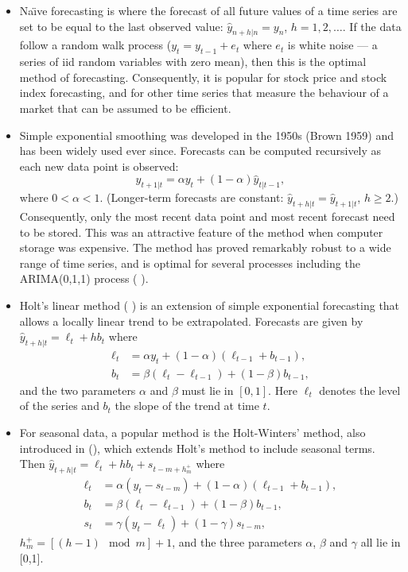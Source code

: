 \documentclass[10pt]{article}
\begin{document}
\begin{itemize}
\item Na\"{\i}ve forecasting is where the forecast of all future values of a time series are set to be equal to the last observed value: $\hat{y}_{n+h|n}=y_n$, $h=1,2,\dots$. If the data follow a random walk process ($y_t=y_{t-1}+e_t$ where $e_t$ is white noise --- a series of iid random variables with zero mean), then this is the optimal method of forecasting. Consequently, it is popular for stock price and stock index forecasting, and for other time series that measure the behaviour of a market that can be assumed to be efficient.

\item Simple exponential smoothing was developed in the 1950s (Brown 1959) and has been widely used ever since. Forecasts can be computed recursively as each new data point is observed:
    \[
    \hat{y}_{t+1|t} = \alpha y_t + (1-\alpha)\hat{y}_{t|t-1},
    \]
    where $0<\alpha<1$. (Longer-term forecasts are constant: $\hat{y}_{t+h|t} = \hat{y}_{t+1|t}$, $h\ge2$.)
    Consequently, only the most recent data point and most recent forecast need to be stored. This was an attractive feature of the method when computer storage was expensive. The method has proved remarkably robust to a wide range of time series, and is optimal for several processes including the ARIMA(0,1,1) process (\citeauthor{CKOS01} \citeyear{CKOS01}).

\item Holt's linear method (\citeauthor{Holt57} \citeyear{Holt57}) is an extension of simple exponential forecasting that allows a locally linear trend to be extrapolated. Forecasts are given by $\hat{y}_{t+h|t} = \ell_t + hb_t$ where
    \begin{align*}
    \ell_t &= \alpha y_t + (1-\alpha)(\ell_{t-1} + b_{t-1}),\\
    b_t &= \beta(\ell_t-\ell_{t-1}) + (1-\beta)b_{t-1},
    \end{align*}
    and the two parameters $\alpha$ and $\beta$ must lie in $[0,1]$. Here $\ell_t$ denotes the level of the series and $b_t$ the slope of the trend at time $t$.

\item For seasonal data, a popular method is the Holt-Winters' method, also introduced in \citeauthor{Holt57} (\citeyear{Holt57}), which extends Holt's method to include seasonal terms. Then $\hat{y}_{t+h|t} = \ell_t + hb_t + s_{t-m+h_m^+}$ where
    \begin{align*}
    \ell_t &= \alpha (y_t -s_{t-m}) + (1-\alpha)(\ell_{t-1} + b_{t-1}),\\
    b_t &= \beta(\ell_t-\ell_{t-1}) + (1-\beta)b_{t-1},\\
    s_t &= \gamma(y_t-\ell_t)+(1-\gamma)s_{t-m},
    \end{align*}
  $h_m^+ = [(h-1)\mod m]+1$, and the three parameters $\alpha$, $\beta$ and $\gamma$ all lie in [0,1].
\end{itemize}
\end{document}
